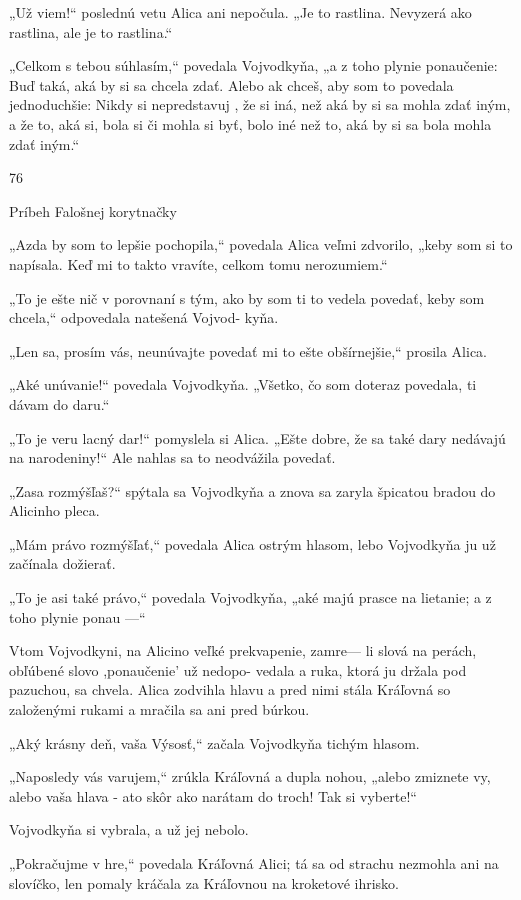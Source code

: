 \documentclass[12pt]{book}
\begin{document}
\begin{Parallel}[p]{}{}
{„Už viem!“ poslednú vetu Alica ani nepočula. „Je to
rastlina. Nevyzerá ako rastlina, ale je to rastlina.“

„Celkom s tebou súhlasím,“ povedala Vojvodkyňa, „a
z toho plynie ponaučenie: Buď taká, aká by si sa chcela
zdať. Alebo ak chceš, aby som to povedala jednoduchšie:
Nikdy si nepredstavuj , že si iná, než aká by si sa mohla zdať
iným, a že to, aká si, bola si či mohla si byť, bolo iné než to,
aká by si sa bola mohla zdať iným.“

76

Príbeh Falošnej korytnačky

„Azda by som to lepšie pochopila,“ povedala Alica veľmi
zdvorilo, „keby som si to napísala. Keď mi to takto vravíte,
celkom tomu nerozumiem.“

„To je ešte nič v porovnaní s tým, ako by som ti to vedela
povedať, keby som chcela,“ odpovedala natešená Vojvod-
kyňa.

„Len sa, prosím vás, neunúvajte povedať mi to ešte
obšírnejšie,“ prosila Alica.

„Aké unúvanie!“ povedala Vojvodkyňa. „Všetko, čo
som doteraz povedala, ti dávam do daru.“

„To je veru lacný dar!“ pomyslela si Alica. „Ešte dobre,
že sa také dary nedávajú na narodeniny!“ Ale nahlas sa to
neodvážila povedať.

„Zasa rozmýšľaš?“ spýtala sa Vojvodkyňa a znova sa
zaryla špicatou bradou do Alicinho pleca.

„Mám právo rozmýšľať,“ povedala Alica ostrým hlasom,
lebo Vojvodkyňa ju už začínala dožierať.

„To je asi také právo,“ povedala Vojvodkyňa, „aké majú
prasce na lietanie; a z toho plynie ponau —“

Vtom Vojvodkyni, na Alicino veľké prekvapenie, zamre—
li slová na perách, obľúbené slovo ,ponaučenie' už nedopo-
vedala a ruka, ktorá ju držala pod pazuchou, sa chvela. Alica
zodvihla hlavu a pred nimi stála Kráľovná so založenými
rukami a mračila sa ani pred búrkou.

„Aký krásny deň, vaša Výsosť,“ začala Vojvodkyňa
tichým hlasom.

„Naposledy vás varujem,“ zrúkla Kráľovná a dupla
nohou, „alebo zmiznete vy, alebo vaša hlava - ato skôr ako
narátam do troch! Tak si vyberte!“

Vojvodkyňa si vybrala, a už jej nebolo.

„Pokračujme v hre,“ povedala Kráľovná Alici; tá sa od
strachu nezmohla ani na slovíčko, len pomaly kráčala za
Kráľovnou na kroketové ihrisko.

}
\end{Parallel}
\end{document}
